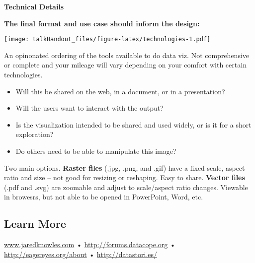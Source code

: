 \documentclass{tufte-handout}
\begin{document}
\textbf{Technical Details}

\textbf{The final format and use case should inform the design:}

\begin{marginfigure}
 \texttt{[image: talkHandout\_files/figure-latex/technologies-1.pdf]}
\caption{An opinonated ordering of the tools available to do data viz. Not comprehensive or complete and your mileage will vary depending on your comfort with certain technologies.}
\end{marginfigure}

\begin{itemize}
\itemsep1pt\parskip0pt
\item
  Will this be shared on the web, in a document, or in a presentation?
\item
  Will the users want to interact with the output?
\item
  Is the visualization intended to be shared and used widely, or is it
  for a short exploration?
\item
  Do others need to be able to manipulate this image?
\end{itemize}

\noindent Two main options. \textbf{Raster files} (.jpg, .png, and .gif)
have a fixed scale, aspect ratio and size -- not good for resizing or
reshaping. Easy to share. \textbf{Vector files} (.pdf and .svg) are
zoomable and adjust to scale/aspect ratio changes. Viewable in browesrs,
but not able to be opened in PowerPoint, Word, etc.

\subsection{Learn More}\label{learn-more}

\href{http://www.jaredknowles.com/presentations}{www.jaredknowles.com} •
\href{http://forums.datacope.org}{\url{http://forums.datacope.org}} •
\href{http://eagereyes.org/about}{\url{http://eagereyes.org/about}} •
\href{http://datastori.es/}{\url{http://datastori.es/}}
\end{document}
